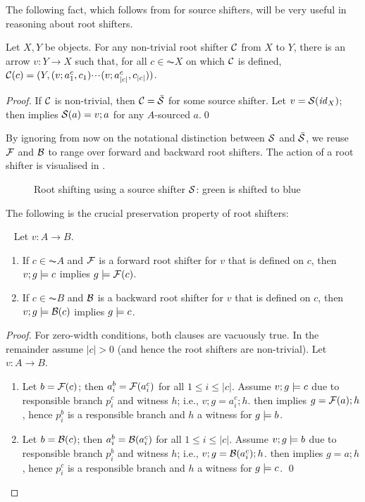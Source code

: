 The following fact, which follows from  for source shifters, will be very useful in reasoning about root shifters.
%
\begin{lemma}
Let $X,Y$ be objects. For any non-trivial root shifter $\mathcal{C}$ from $X$ to $Y$, there is an arrow $v:Y\to X$ such that, for all $c\in \AC X$ on which $\mathcal{C}$ is defined, $\mathcal{C}(c)= (Y,(v;a^c_1,c_1){\cdotp\mkern-2mu\cdotp\mkern-2mu\cdotp\mkern1mu} (v;a^c_{|c|},c_{|c|}))$.
\end{lemma}
%
\begin{proof}
If $\mathcal{C}$ is non-trivial, then $\mathcal{C}=\bar{\mathcal{S}}$ for some source shifter. Let $v=\mathcal{S}(\mathit{id}_X)$; then  implies $\mathcal{S}(a)=v;a$ for any $A$-sourced $a$.\qed
\end{proof}
%
By ignoring from now on the notational distinction between $\mathcal{S}$ and $\bar{\mathcal{S}}$, we reuse $\mathcal{F}$ and $\mathcal{B}$ to range over forward and backward root shifters. The action of a root shifter is visualised in .
%
\begin{figure}
\centering

\caption{Root shifting using a source shifter $\mathcal{S}$: green is shifted to blue}
\end{figure}
%
The following is the crucial preservation property of root shifters:
%
\begin{proposition}~
Let $v:A\to B$.
\begin{enumerate}[topsep=\smallskipamount]
\item If $c\in \AC A$ and $\mathcal{F}$ is a forward root shifter for $v$ that is defined on $c$, then $v;g\models c$ implies $g\models \mathcal{F}(c)$.
\item If $c\in \AC B$ and $\mathcal{B}$ is a backward root shifter for $v$ that is defined on $c$, then $v;g\models \mathcal{B}(c)$ implies $g\models c$.
\end{enumerate}
\end{proposition}
%
\begin{proof}
For zero-width conditions, both clauses are vacuously true. In the remainder assume $|c|>0$ (and hence the root shifters are non-trivial). Let $v:A\to B$.
\begin{enumerate}
\item Let $b=\mathcal{F}(c)$; then $a^b_i=\mathcal{F}(a^c_i)$ for all $1\leq i\leq |c|$. Assume $v;g\models c$ due to responsible branch $p^c_i$ and witness $h$; i.e., $v;g=a^c_i;h$.  then implies $g=\mathcal{F}(a);h$, hence $p^b_i$ is a responsible branch and $h$ a witness for $g\models b$.
\item Let $b=\mathcal{B}(c)$; then $a^b_i=\mathcal{B}(a^c_i)$ for all $1\leq i\leq |c|$. Assume $v;g\models b$ due to responsible branch $p^b_i$ and witness $h$; i.e., $v;g=\mathcal{B}(a^c_i);h$.  then implies $g=a;h$, hence $p^c_i$ is a responsible branch and $h$ a witness for $g\models c$.
\qed
\end{enumerate}
\end{proof}
